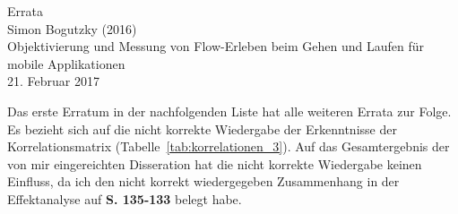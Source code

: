 \documentclass[12pt, twoside=semi, DIV=calc, pagesize, parskip=half, listof=totoc, bibliography=totoc, open=right, listof=nochaptergap, pointlessnumbers, final]{scrreprt}
\begin{document}

\begin{center}
\Huge Errata\\
\vspace{5mm}
\normalsize Simon Bogutzky (2016)\\
\normalsize Objektivierung und Messung von Flow-Erleben beim Gehen und Laufen für mobile Applikationen\\
\vspace{5mm}
\normalsize 21. Februar 2017\\
\end{center}

Das erste Erratum in der nachfolgenden Liste hat alle weiteren Errata zur Folge. Es bezieht sich auf die nicht korrekte Wiedergabe der Erkenntnisse der Korrelationsmatrix (Tabelle~\ref{tab:korrelationen_3}). Auf das Gesamtergebnis der von mir eingereichten Disseration hat die nicht korrekte Wiedergabe keinen Einfluss, da ich den nicht korrekt wiedergegeben Zusammenhang in der Effektanalyse auf \textbf{S. 135-133} belegt habe.
\end{document}
